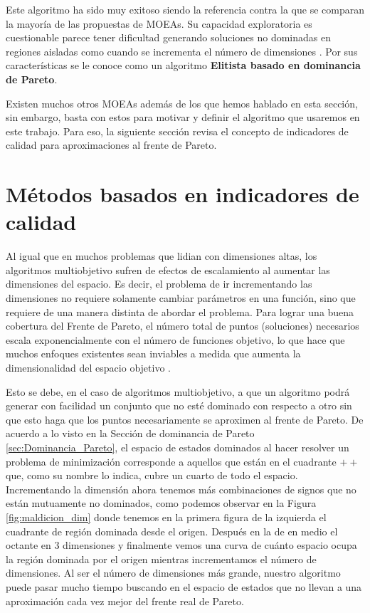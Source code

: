 Este algoritmo ha sido muy exitoso siendo la referencia contra la que se comparan la mayoría de las propuestas de MOEAs. Su capacidad exploratoria es cuestionable  parece tener dificultad generando soluciones no dominadas en regiones aisladas como cuando se incrementa el número de dimensiones \cite{coelloEvolutionaryAlgorithmsSolving}. Por sus características se le conoce como un algoritmo \textbf{Elitista basado en dominancia de Pareto}.

Existen muchos otros MOEAs además de los que hemos hablado en esta sección, sin embargo, basta con estos para motivar y definir el algoritmo que usaremos en este trabajo. Para eso, la siguiente sección revisa el concepto de indicadores de calidad para aproximaciones al frente de Pareto. 

\section{Métodos basados en indicadores de calidad} \label{sec:Metodos_QI}

Al igual que en muchos problemas que lidian con dimensiones altas, los algoritmos multiobjetivo sufren de efectos de escalamiento al aumentar las dimensiones del espacio. Es decir, el problema de ir incrementando las dimensiones no requiere solamente cambiar parámetros en una función, sino que requiere de una manera distinta de abordar el problema.
Para lograr una buena cobertura del Frente de Pareto, el número total de puntos (soluciones) necesarios escala exponencialmente con el número de funciones objetivo, lo que hace que muchos enfoques existentes sean inviables a medida que aumenta la dimensionalidad del espacio objetivo \cite{tanParetoOptimizationSmall2023}. 

Esto se debe, en el caso de algoritmos multiobjetivo, a que un algoritmo podrá generar con facilidad un conjunto que no esté dominado con respecto a otro sin que esto haga que los puntos necesariamente se aproximen al frente de Pareto. De acuerdo a lo visto en la Sección de dominancia de Pareto \ref{sec:Dominancia_Pareto}, el espacio de estados dominados al hacer resolver un problema de minimización corresponde a aquellos que están en el cuadrante $++$ que, como su nombre lo indica, cubre un cuarto de todo el espacio. Incrementando la dimensión ahora tenemos más combinaciones de signos que no están mutuamente no dominados, como podemos observar en la Figura \ref{fig:maldicion_dim} donde tenemos en la primera figura de la izquierda el cuadrante de región dominada desde el origen. Después en la de en medio el octante en 3 dimensiones y finalmente vemos una curva de cuánto espacio ocupa la región dominada por el origen mientras incrementamos el número de dimensiones. Al ser el número de dimensiones más grande, nuestro algoritmo puede pasar mucho tiempo buscando en el espacio de estados que no llevan a una aproximación cada vez mejor del frente real de Pareto. 

